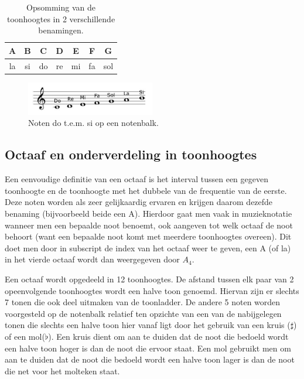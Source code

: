 \begin{table}
  \centering
  \begin{tabular}{ c c c c c c c }
    A & B & C & D & E & F & G \\
    \hline
    \hline
    la & si & do & re & mi & fa & sol \\
  \end{tabular}
  \caption{Opsomming van de toonhoogtes in 2 verschillende benamingen.}
  \label{tabel:toonhoogte}
\end{table}

\begin{figure}[!ht]
  \centering
  \includegraphics[width=0.5\textwidth]{1_Muzikale_Achtergrond/toonladder}
  \caption{Noten do t.e.m. si op een notenbalk.}
  \label{figuur:toonladder}
\end{figure}

\subsection{Octaaf en onderverdeling in toonhoogtes}
Een eenvoudige definitie van een octaaf is het interval tussen een gegeven toonhoogte en de toonhoogte met het dubbele van de frequentie van de eerste. Deze noten worden als zeer gelijkaardig ervaren en krijgen daarom dezefde benaming (bijvoorbeeld beide een A). Hierdoor gaat men vaak in muzieknotatie wanneer men een bepaalde noot benoemt, ook aangeven tot welk octaaf de noot behoort (want een bepaalde noot komt met meerdere toonhoogtes overeen). Dit doet men door in subscript de index van het octaaf weer te geven, een A (of la) in het vierde octaaf wordt dan weergegeven door $A_{4}$.

Een octaaf wordt opgedeeld in 12 toonhoogtes. De afstand tussen elk paar van 2 opeenvolgende toonhoogtes wordt een halve toon genoemd. Hiervan zijn er slechts 7 tonen die ook deel uitmaken van de toonladder. De andere 5 noten worden voorgesteld op de notenbalk relatief ten opzichte van een van de nabijgelegen tonen die slechts een halve toon hier vanaf ligt door het gebruik van een kruis ($\sharp$) of een mol($\flat$). Een kruis dient om aan te duiden dat de noot die bedoeld wordt een halve toon hoger is dan de noot die ervoor staat. Een mol gebruikt men om aan te duiden dat de noot die bedoeld wordt een halve toon lager is dan de noot die net voor het molteken staat.

